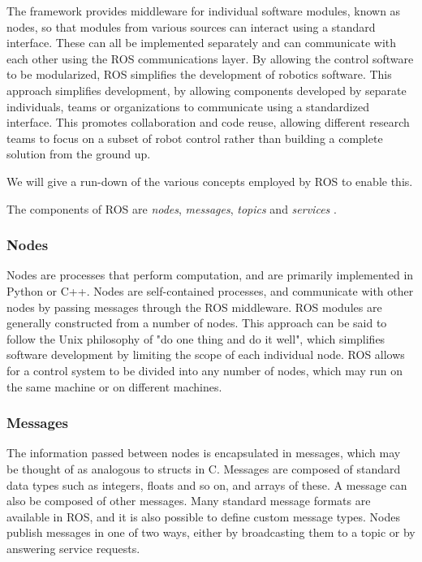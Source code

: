 \documentclass[\rootfolder/main.tex]{subfiles}
\begin{document}
The framework provides middleware for individual software modules, known as nodes, so that modules from various sources can interact using a standard interface.
These can all be implemented separately and can communicate with each other using the ROS communications layer.
By allowing the control software to be modularized, ROS simplifies the development of robotics software.
This approach simplifies development, by allowing components developed by separate individuals, teams or organizations to communicate using a standardized interface.
This promotes collaboration and code reuse, allowing different research teams to focus on a subset of robot control rather than building a complete solution from the ground up.

We will give a run-down of the various concepts employed by ROS to enable this.

The components of ROS are \emph{nodes}, \emph{messages}, \emph{topics} and \emph{services} \cite{Quigley2009}.

\subsubsection{Nodes}

Nodes are processes that perform computation, and are primarily implemented in Python or C++.
Nodes are self-contained processes, and communicate with other nodes by passing messages through the ROS middleware.
ROS modules are generally constructed from a number of nodes.
This approach can be said to follow the Unix philosophy of "do one thing and do it well", which simplifies software development by limiting the scope of each individual node.
ROS allows for a control system to be divided into any number of nodes, which may run on the same machine or on different machines.

\subsubsection{Messages}

The information passed between nodes is encapsulated in messages, which may be thought of as analogous to structs in C.
Messages are composed of standard data types such as integers, floats and so on, and arrays of these.
A message can also be composed of other messages.
Many standard message formats are available in ROS, and it is also possible to define custom message types.
Nodes publish messages in one of two ways, either by broadcasting them to a topic or by answering service requests.
\end{document}
